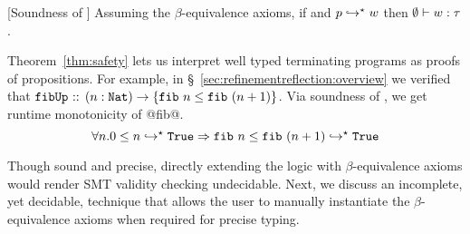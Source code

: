 \begin{theorem}{[Soundness of \corelan]}\label{thm:safety}
Assuming the $\beta$-equivalence axioms,
if \hastype{\emptyset}{\prog}{\typ}
       and ${p}\hookrightarrow^{\star}{w}$ then $\emptyset \vdash w : \tau$.
\end{theorem}

Theorem~\ref{thm:safety} lets us interpret well typed terminating programs as proofs of
propositions.
%
For example, in \S~\ref{sec:refinementreflection:overview} we verified that
%
$\texttt{fibUp}\text{ :: }{\ensuremath{{(n:\mathtt{Nat})} \rightarrow {\{\ensuremath{\texttt{fib}\ {n}} \leq \ensuremath{\texttt{fib}\ {(n+1)}}\}}}}$.
%
Via soundness of \corelan, we get runtime monotonicity of @fib@.
$$
\forall n. {0 \leq n}\hookrightarrow^{\star}{\mathtt{True}} \Rightarrow {\ensuremath{\texttt{fib}\ {n}} \leq \ensuremath{\texttt{fib}\ {(n+1)}}}\hookrightarrow^{\star}{\mathtt{True}}
$$

%
Though sound and precise, directly extending the logic with $\beta$-equivalence axioms
would render SMT validity checking undecidable.
%
Next, we discuss an incomplete,
yet decidable, technique that allows the
user to manually instantiate the $\beta$-equivalence axioms
when required for precise typing.
